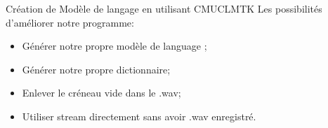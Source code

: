 \begin{frame}{Création de Modèle de langage en utilisant CMUCLMTK}
Les possibilités d'améliorer notre programme:
\begin{itemize}
\item Générer notre propre modèle de language ;
\item Générer notre propre dictionnaire;
\item Enlever le créneau vide dans le .wav;
\item Utiliser stream directement sans avoir .wav enregistré.
\end{itemize}
\end{frame}

